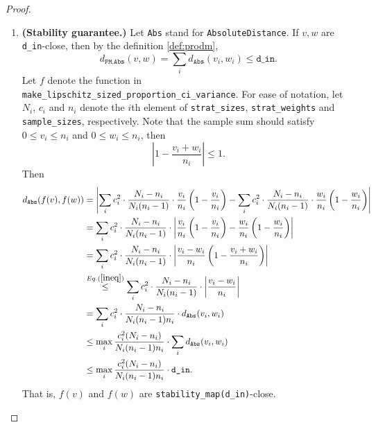\documentclass[11pt,a4paper]{article}
\begin{document}
\begin{proof}
\begin{enumerate}
    \smallskip
    \item \textbf{(Stability guarantee.)}  Let \texttt{Abs} stand for \texttt{AbsoluteDistance}.
    If $v, w$ are \texttt{d\_in}-close, then by the definition \ref{def:prodm},
    \begin{equation*}
        d_\texttt{PM,Abs}(v, w) = \sum_{i}d_\texttt{Abs}(v_i, w_i) \leq \texttt{d\_in}.    
    \end{equation*}
    Let $f$ denote the function in \texttt{make\_lipschitz\_sized\_proportion\_ci\_variance}. For ease of notation, let $N_i$, $c_i$ and $n_i$ denote the $i$th element of
    \texttt{strat\_sizes}, \texttt{strat\_weights} and \texttt{sample\_sizes}, respectively. 
    Note that the sample sum should satisfy $0 \leq v_i \leq n_i$ and $0 \leq w_i \leq n_i$, then
    \begin{equation}\label{ineq}
        \left|1 - \frac{v_i + w_i}{n_i}\right| \leq 1.
    \end{equation}
    Then 
    \begin{equation*}
        \begin{aligned}
            d_\texttt{Abs}(f(v), f(w))  & = \left|\sum_{i} c_i^2 \cdot \frac{N_i - n_i}{N_i(n_i -1)}\cdot \frac{v_i}{n_i} \left(1 - \frac{v_i}{n_i} \right) - \sum_{i} c_i^2 \cdot \frac{N_i - n_i}{N_i(n_i -1)} \cdot \frac{w_i}{n_i}  \left(1 - \frac{w_i}{n_i} \right) \right| \\
            & = \sum_{i} c_i^2 \cdot \frac{N_i - n_i}{N_i(n_i -1)} \cdot  \left|\frac{v_i}{n_i}\left(1 - \frac{v_i}{n_i} \right) - \frac{w_i}{n_i}\left(1 - \frac{w_i}{n_i} \right) \right| \\
            & = \sum_{i} c_i^2  \cdot \frac{N_i - n_i}{N_i(n_i -1)} \cdot \left| \frac{v_i - w_i}{n_i} \left(1 - \frac{v_i + w_i}{n_i}\right) \right|\\ %
            & \stackrel{Eq. (\ref{ineq})}{\leq} \sum_{i} c_i^2  \cdot \frac{N_i - n_i}{N_i(n_i -1)} \cdot \left| \frac{v_i - w_i}{n_i} \right|\\
            & = \sum_{i} c_i^2  \cdot \frac{N_i - n_i}{N_i(n_i -1)n_i}
            \cdot d_\texttt{Abs}(v_i, w_i) \\
            & \leq \max_i \frac{c_i^2 (N_i - n_i)}{N_i(n_i -1)n_i} \cdot
            \sum_{i}  d_\texttt{Abs}(v_i, w_i)\\
            & \leq \max_i \frac{c_i^2 (N_i - n_i)}{N_i(n_i -1)n_i}\cdot
            \texttt{d\_in}.
        \end{aligned}
    \end{equation*}
    That is, $f(v)$ and $f(w)$ are \texttt{stability\_map(d\_in)}-close.  
    
   
\end{enumerate}
\end{proof}
\end{document}
